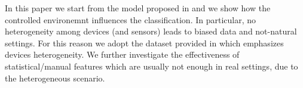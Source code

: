 In this paper we start from the model proposed in \cite{ignatov2018real} and we show how the controlled
environemnt influences the classification. In particular, no
heterogeneity among devices (and sensors) leads to biased data and
not-natural settings.  For this reason we adopt the dataset provided
in \cite{stisen2015smart} which emphasizes devices heterogeneity.
We further investigate the
effectiveness of statistical/manual features which are usually not
enough in real settings, due to the heterogeneous scenario. 

